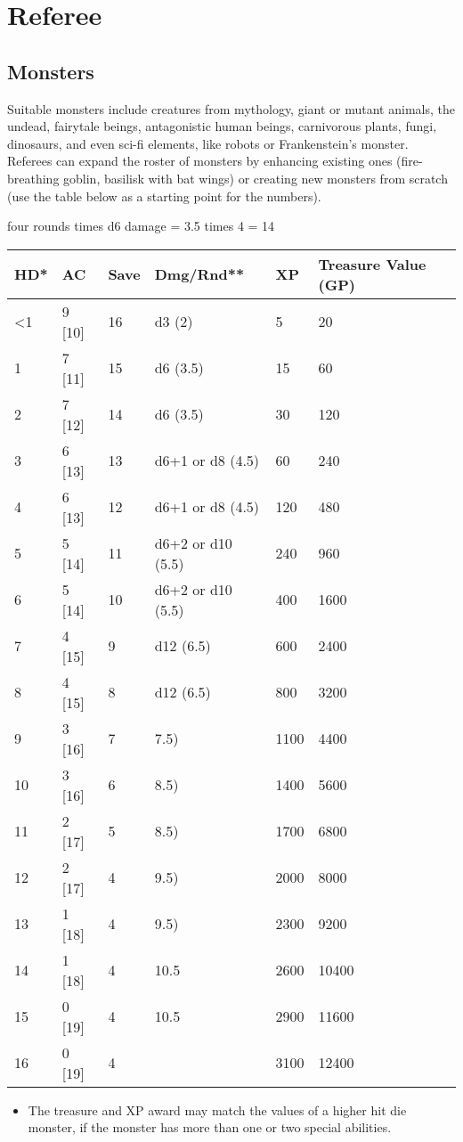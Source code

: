 \section{Referee}\label{referee}

\subsection{Monsters}\label{monsters}

Suitable monsters include creatures from mythology, giant or mutant
animals, the undead, fairytale beings, antagonistic human beings,
carnivorous plants, fungi, dinosaurs, and even sci-fi elements, like
robots or Frankenstein's monster. Referees can expand the roster of
monsters by enhancing existing ones (fire-breathing goblin, basilisk
with bat wings) or creating new monsters from scratch (use the table
below as a starting point for the numbers).

four rounds times d6 damage = 3.5 times 4 = 14

\begin{longtable}[]{@{}llllll@{}}
\toprule
HD* & AC & Save & Dmg/Rnd** & XP & Treasure Value (GP)\tabularnewline
\midrule
\endhead
\textless{}1 & 9 {[}10{]} & 16 & d3 (2) & 5 & 20\tabularnewline
1 & 7 {[}11{]} & 15 & d6 (3.5) & 15 & 60\tabularnewline
2 & 7 {[}12{]} & 14 & d6 (3.5) & 30 & 120\tabularnewline
3 & 6 {[}13{]} & 13 & d6+1 or d8 (4.5) & 60 & 240\tabularnewline
4 & 6 {[}13{]} & 12 & d6+1 or d8 (4.5) & 120 & 480\tabularnewline
5 & 5 {[}14{]} & 11 & d6+2 or d10 (5.5) & 240 & 960\tabularnewline
6 & 5 {[}14{]} & 10 & d6+2 or d10 (5.5) & 400 & 1600\tabularnewline
7 & 4 {[}15{]} & 9 & d12 (6.5) & 600 & 2400\tabularnewline
8 & 4 {[}15{]} & 8 & d12 (6.5) & 800 & 3200\tabularnewline
9 & 3 {[}16{]} & 7 & 7.5) & 1100 & 4400\tabularnewline
10 & 3 {[}16{]} & 6 & 8.5) & 1400 & 5600\tabularnewline
11 & 2 {[}17{]} & 5 & 8.5) & 1700 & 6800\tabularnewline
12 & 2 {[}17{]} & 4 & 9.5) & 2000 & 8000\tabularnewline
13 & 1 {[}18{]} & 4 & 9.5) & 2300 & 9200\tabularnewline
14 & 1 {[}18{]} & 4 & 10.5 & 2600 & 10400\tabularnewline
15 & 0 {[}19{]} & 4 & 10.5 & 2900 & 11600\tabularnewline
16 & 0 {[}19{]} & 4 & & 3100 & 12400\tabularnewline
\bottomrule
\end{longtable}

\begin{itemize}
\tightlist
\item
  The treasure and XP award may match the values of a higher hit die
  monster, if the monster has more than one or two special abilities.
\end{itemize}


